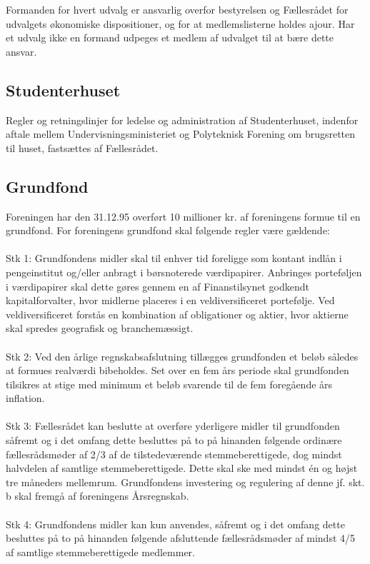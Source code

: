 \begin{list}
\item Formanden for hvert udvalg er ansvarlig overfor bestyrelsen og Fællesrådet for udvalgets økonomiske dispositioner, og for at medlemslisterne holdes ajour. Har et udvalg ikke en formand udpeges et medlem af udvalget til at bære dette ansvar.



\subsection{Studenterhuset}
\item Regler og retningslinjer for ledelse og administration af Studenterhuset, indenfor aftale mellem Undervisningsministeriet og Polyteknisk Forening om brugsretten til huset, fastsættes af Fællesrådet.




\subsection{Grundfond}
\label{kapL:grundfond}
\item \label{L:grund:stor} Foreningen har den 31.12.95 overført 10 millioner kr. af foreningens formue til en grundfond.
For foreningens grundfond skal følgende regler være gældende:
\\
\\Stk 1: Grundfondens midler skal til enhver tid foreligge som kontant indlån i pengeinstitut og/eller anbragt i børsnoterede værdipapirer. Anbringes porteføljen i værdipapirer skal dette gøres gennem en af Finanstilsynet godkendt kapitalforvalter, hvor midlerne placeres i en veldiversificeret portefølje. Ved veldiversificeret forstås en kombination af obligationer og aktier, hvor aktierne skal spredes geografisk og branchemæssigt.
\\
\\Stk 2: Ved den årlige regnskabsafslutning tillægges grundfonden et beløb således at formues realværdi bibeholdes. Set over en fem års periode skal grundfonden tilsikres at stige med minimum et beløb svarende til de fem foregående års inflation.
\\
\\
Stk 3: Fællesrådet kan beslutte at overføre yderligere midler til grundfonden såfremt og i det omfang dette besluttes på to på hinanden følgende ordinære fællesrådsmøder af 2/3 af de tilstedeværende stemmeberettigede, dog mindst halvdelen af samtlige stemmeberettigede. Dette skal ske med mindst én og højst tre måneders mellemrum. Grundfondens investering og regulering af denne jf. skt. b skal fremgå af foreningens Årsregnskab.
\\
\\
Stk 4: Grundfondens midler kan kun anvendes, såfremt og i det omfang dette besluttes på to på hinanden følgende afsluttende fællesrådsmøder af mindst 4/5 af samtlige stemmeberettigede medlemmer. 


\end{list}
